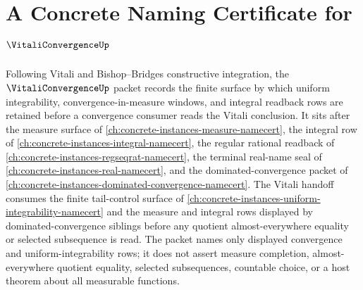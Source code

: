 \chapter{A Concrete Naming Certificate for $\VitaliConvergenceUp$}
\label{ch:concrete-instances-vitali-convergence-namecert}

Following Vitali and Bishop--Bridges constructive integration, the $\VitaliConvergenceUp$ packet records the finite surface by which uniform integrability, convergence-in-measure windows, and integral readback rows are retained before a convergence consumer reads the Vitali conclusion. It sits after the measure surface of \autoref{ch:concrete-instances-measure-namecert}, the integral row of \autoref{ch:concrete-instances-integral-namecert}, the regular rational readback of \autoref{ch:concrete-instances-regseqrat-namecert}, the terminal real-name seal of \autoref{ch:concrete-instances-real-namecert}, and the dominated-convergence packet of \autoref{ch:concrete-instances-dominated-convergence-namecert}. The Vitali handoff consumes the finite tail-control surface of \autoref{ch:concrete-instances-uniform-integrability-namecert} and the measure and integral rows displayed by dominated-convergence siblings before any quotient almost-everywhere equality or selected subsequence is read. The packet names only displayed convergence and uniform-integrability rows; it does not assert measure completion, almost-everywhere quotient equality, selected subsequences, countable choice, or a host theorem about all measurable functions.

